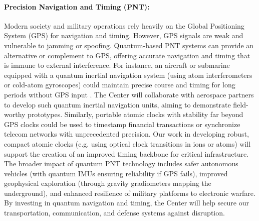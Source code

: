 \documentclass[12pt]{article}
\begin{document}
\paragraph{Precision Navigation and Timing (PNT):} Modern society and military operations rely heavily on the Global Positioning System (GPS) for navigation and timing. However, GPS signals are weak and vulnerable to jamming or spoofing. Quantum-based PNT systems can provide an alternative or complement to GPS, offering accurate navigation and timing that is immune to external interference. For instance, an aircraft or submarine equipped with a quantum inertial navigation system (using atom interferometers or cold-atom gyroscopes) could maintain precise course and timing for long periods without GPS input . The Center will collaborate with aerospace partners to develop such quantum inertial navigation units, aiming to demonstrate field-worthy prototypes. Similarly, portable atomic clocks with stability far beyond GPS clocks could be used to timestamp financial transactions or synchronize telecom networks with unprecedented precision. Our work in developing robust, compact atomic clocks (e.g. using optical clock transitions in ions or atoms) will support the creation of an improved timing backbone for critical infrastructure. The broader impact of quantum PNT technology includes safer autonomous vehicles (with quantum IMUs ensuring reliability if GPS fails), improved geophysical exploration (through gravity gradiometers mapping the underground), and enhanced resilience of military platforms to electronic warfare. By investing in quantum navigation and timing, the Center will help secure our transportation, communication, and defense systems against disruption.
\end{document}
